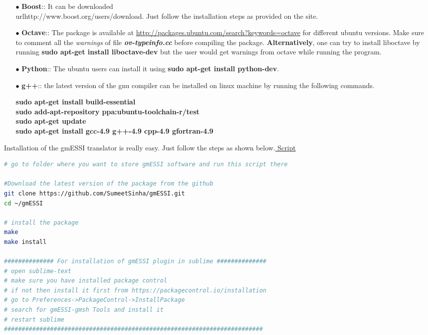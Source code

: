 \documentclass[11pt]{article}
\begin{document}
\begin{itemize}

  \item[$\bullet$] \textbf{Boost}:: It can be downloaded
  \\url{http://www.boost.org/users/download}. Just follow the installation
  steps as provided on the site.

  \item[$\bullet$] \textbf{Octave}:: The package is available at
  \url{http://packages.ubuntu.com/search?keywords=octave} for different
  ubuntu versions. Make sure to comment all the \textit{warnings} of file
  \textit{\textbf{ov-typeinfo.cc}} before compiling the package.
  \textbf{Alternatively}, one can try to install liboctave by running
  \textbf{sudo apt-get install liboctave-dev} but the user would get warnings
  from octave while running the program.

  \item[$\bullet$] \textbf{Python}:: The ubuntu users can install it using
  \textbf{sudo apt-get install python-dev}.

  \item[$\bullet$] \textbf{g++}:: the latest version of the gnu compiler can
  be installed on linux machine by running the following commands.

  \textbf{sudo apt-get install build-essential}\\   
  \textbf{sudo add-apt-repository ppa:ubuntu-toolchain-r/test} \\ 
  \textbf{sudo apt-get update}\\
  \textbf{sudo apt-get install gcc-4.9 g++-4.9 cpp-4.9 gfortran-4.9} 

\end{itemize}

Installation of the gmESSI translator is really easy. Just follow the steps as
shown below.\href{http://beta.sumeetsinha.in/gmESSI/Install.sh}{ Script}

\begin{lstlisting}[language=bash]
# go to folder where you want to store gmESSI software and run this script there

#Download the latest version of the package from the github
git clone https://github.com/SumeetSinha/gmESSI.git
cd ~/gmESSI

# install the package 
make
make install

############## For installation of gmESSI plugin in sublime ##############
# open sublime-text
# make sure you have installed package control 
# if not then install it first from https://packagecontrol.io/installation
# go to Preferences->PackageControl->InstallPackage
# search for gmESSI-gmsh Tools and install it
# restart sublime
#########################################################################

\end{lstlisting}
\end{document}
